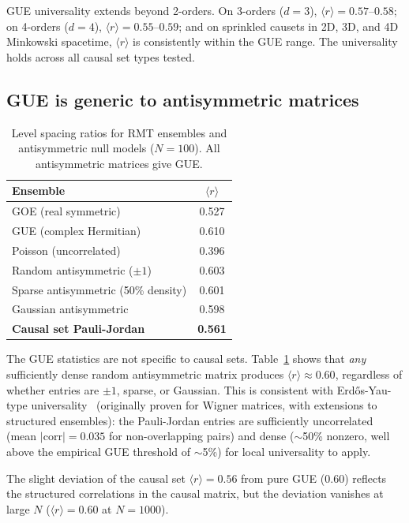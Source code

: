 \documentclass[aps,prd,twocolumn,superscriptaddress,nofootinbib]{revtex4-2}
\begin{document}
GUE universality extends beyond 2-orders. On 3-orders ($d = 3$), $\langle r \rangle = 0.57$--$0.58$; on 4-orders ($d = 4$), $\langle r \rangle = 0.55$--$0.59$; and on sprinkled causets in 2D, 3D, and 4D Minkowski spacetime, $\langle r \rangle$ is consistently within the GUE range. The universality holds across all causal set types tested.

\subsection{GUE is generic to antisymmetric matrices}

\begin{table}[h]
\centering
\begin{tabular}{lc}
\toprule
Ensemble & $\langle r \rangle$ \\
\midrule
GOE (real symmetric) & 0.527 \\
GUE (complex Hermitian) & 0.610 \\
Poisson (uncorrelated) & 0.396 \\
Random antisymmetric ($\pm 1$) & 0.603 \\
Sparse antisymmetric (50\% density) & 0.601 \\
Gaussian antisymmetric & 0.598 \\
\textbf{Causal set Pauli-Jordan} & \textbf{0.561} \\
\bottomrule
\end{tabular}
\caption{Level spacing ratios for RMT ensembles and antisymmetric null models ($N = 100$). All antisymmetric matrices give GUE.}
\label{tab:null}
\end{table}

The GUE statistics are not specific to causal sets. Table~\ref{tab:null} shows that \emph{any} sufficiently dense random antisymmetric matrix produces $\langle r \rangle \approx 0.60$, regardless of whether entries are $\pm 1$, sparse, or Gaussian. This is consistent with Erd\H{o}s-Yau-type universality~\cite{erdos2012} (originally proven for Wigner matrices, with extensions to structured ensembles): the Pauli-Jordan entries are sufficiently uncorrelated (mean $|\mathrm{corr}| = 0.035$ for non-overlapping pairs) and dense ($\sim$50\% nonzero, well above the empirical GUE threshold of $\sim$5\%) for local universality to apply.

The slight deviation of the causal set $\langle r \rangle = 0.56$ from pure GUE ($0.60$) reflects the structured correlations in the causal matrix, but the deviation vanishes at large $N$ ($\langle r \rangle = 0.60$ at $N = 1000$).
\end{document}
